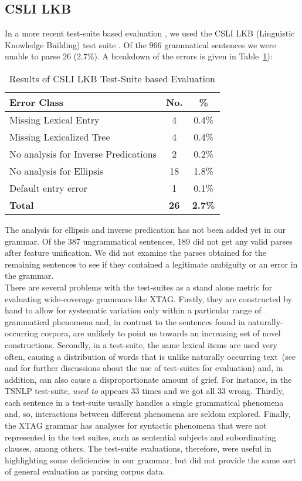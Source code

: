 \subsection{CSLI LKB}

In a more recent test-suite based evaluation \cite{prasadandsarkar00}, we
used the CSLI LKB (Linguistic Knowledge Building) test suite
\cite{copestake99:_lkb_system}. Of the 966 grammatical sentences we were
unable to parse 26 (2.7\%). A breakdown of the errors is given in
Table~\ref{tab:CSLI_analysis}):

\begin{table}[htb]
\centering
\begin{tabular}{|l|c|c|} \hline \hline
Error Class & No. & \% \\ \hline \hline
Missing Lexical Entry & 4 & 0.4\% \\ \hline
Missing Lexicalized Tree & 4 & 0.4\% \\ \hline
No analysis for Inverse Predications & 2 & 0.2\% \\ \hline
No analysis for Ellipsis & 18 & 1.8\% \\ \hline
Default entry error & 1 & 0.1\% \\ \hline
{\bf Total} & {\bf 26} & {\bf 2.7\%} \\ \hline
\end{tabular}
 \caption{\label{tab:CSLI_analysis} Results of CSLI LKB Test-Suite based Evaluation}
\end{table}

The analysis for ellipsis and inverse predication has not been added yet in
our grammar. Of the 387 ungrammatical sentences, 189 did not get any valid
parses after feature unification. We did not examine the parses obtained
for the remaining sentences to see if they contained a legitimate ambiguity
or an error in the grammar.\\

There are several problems with the test-suites as a stand alone metric for
evaluating wide-coverage grammars like XTAG. Firstly, they are constructed
by hand to allow for systematic variation only within a particular range of
grammatical phenomena and, in contrast to the sentences found in
naturally-occurring corpora, are unlikely to point us towards an increasing
set of novel constructions. Secondly, in a test-suite, the same lexical
items are used very often, causing a distribution of words that is unlike
naturally occurring text~(see \cite{c.97:_maint_xtag} and
\cite{prasadandsarkar00} for further discussions about the use of
test-suites for evaluation) and, in addition, can also cause a
disproportionate amount of grief. For instance, in the TSNLP test-suite,
{\it used to} appears 33 times and we got all 33 wrong. Thirdly, each
sentence in a test-suite usually handles a single grammatical phenomena
and, so, interactions between different phenomena are seldom
explored. Finally, the XTAG grammar has analyses for syntactic phenomena
that were not represented in the test suites, such as sentential subjects
and subordinating clauses, among others. The test-suite evaluations,
therefore, were useful in highlighting some deficiencies in our grammar,
but did not provide the same sort of general evaluation as parsing corpus
data.

